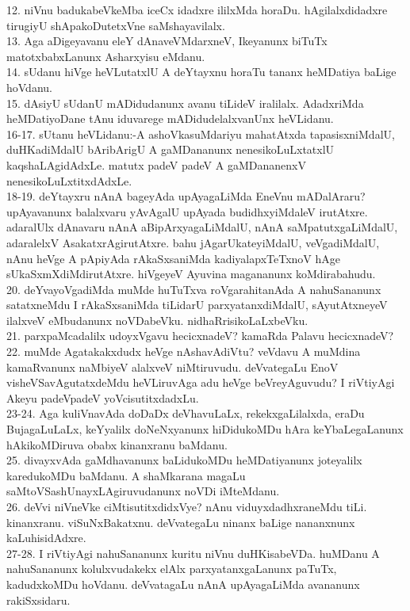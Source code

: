 \documentclass{article}
\begin{document}
12. niVnu badukabeVkeMba iceCx idadxre ililxMda horaDu. hAgilalxdidadxre tirugiyU shApakoDutetxVne saMshayavilalx.\\
13. Aga aDigeyavanu eleY dAnaveVMdarxneV, Ikeyanunx biTuTx matotxbabxLanunx Asharxyisu eMdanu.\\
14. sUdanu hiVge heVLutatxlU A deYtayxnu horaTu tananx heMDatiya baLige hoVdanu.\\
15. dAsiyU sUdanU mADidudanunx avanu tiLideV iralilalx. AdadxriMda heMDatiyoDane tAnu iduvarege mADidudelalxvanUnx heVLidanu.\\
16-17. sUtanu heVLidanu:-A ashoVkasuMdariyu mahatAtxda tapasisxniMdalU, duHKadiMdalU bAribArigU A gaMDananunx nenesikoLuLxtatxlU kaqshaLAgidAdxLe. matutx padeV padeV A gaMDananenxV nenesikoLuLxtitxdAdxLe.\\
18-19. deYtayxru nAnA bageyAda upAyagaLiMda EneVnu mADalAraru? upAyavanunx balalxvaru yAvAgalU upAyada budidhxyiMdaleV irutAtxre. adaralUlx dAnavaru nAnA aBipArxyagaLiMdalU, nAnA saMpatutxgaLiMdalU, adaralelxV AsakatxrAgirutAtxre. bahu jAgarUkateyiMdalU, veVgadiMdalU, nAnu heVge A pApiyAda rAkaSxsaniMda kadiyalapxTeTxnoV hAge sUkaSxmXdiMdirutAtxre. hiVgeyeV Ayuvina magananunx koMdirabahudu.\\
20. deYvayoVgadiMda muMde huTuTxva roVgarahitanAda A nahuSananunx satatxneMdu I rAkaSxsaniMda tiLidarU parxyatanxdiMdalU, sAyutAtxneyeV ilalxveV eMbudanunx noVDabeVku. nidhaRrisikoLaLxbeVku.\\
21. parxpaMcadalilx udoyxVgavu hecicxnadeV? kamaRda Palavu hecicxnadeV?\\
22. muMde Agatakakxdudx heVge nAshavAdiVtu? veVdavu A muMdina kamaRvanunx naMbiyeV alalxveV niMtiruvudu. deVvategaLu EnoV visheVSavAgutatxdeMdu heVLiruvAga adu heVge beVreyAguvudu? I riVtiyAgi Akeyu padeVpadeV yoVcisutitxdadxLu.\\
23-24. Aga kuliVnavAda doDaDx deVhavuLaLx, rekekxgaLilalxda, eraDu BujagaLuLaLx, keYyalilx doNeNxyanunx hiDidukoMDu hAra keYbaLegaLanunx hAkikoMDiruva obabx kinanxranu baMdanu.\\
25. divayxvAda gaMdhavanunx baLidukoMDu heMDatiyanunx joteyalilx karedukoMDu baMdanu. A shaMkarana magaLu saMtoVSashUnayxLAgiruvudanunx noVDi iMteMdanu.\\
26. deVvi niVneVke ciMtisutitxdidxVye? nAnu viduyxdadhxraneMdu tiLi. kinanxranu. viSuNxBakatxnu. deVvategaLu ninanx baLige nananxnunx kaLuhisidAdxre.\\
27-28. I riVtiyAgi nahuSananunx kuritu niVnu duHKisabeVDa. huMDanu A nahuSananunx kolulxvudakekx elAlx parxyatanxgaLanunx paTuTx, kadudxkoMDu hoVdanu. deVvatagaLu nAnA upAyagaLiMda avananunx rakiSxsidaru.\\
\end{document}
